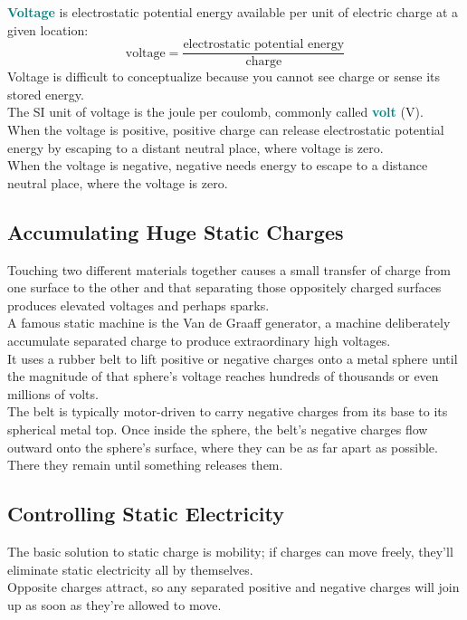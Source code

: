 \documentclass[12pt]{article}
\theoremstyle{definition}
\newcommand{\defnterm}[1]{\textbf{\textcolor{teal}{#1}}\index{#1}}
\begin{document}
\defnterm{Voltage} is electrostatic potential energy available per unit of electric charge at a given location:
$$\text{voltage} = \frac{\text{electrostatic potential energy}}{\text{charge}}$$
Voltage is difficult to conceptualize because you cannot see charge or sense its stored energy. \\
The SI unit of voltage is the joule per coulomb, commonly called \defnterm{volt} (V). \\
When the voltage is positive, positive charge can release electrostatic potential energy by escaping to a distant neutral place, where voltage is zero. \\
When the voltage is negative, negative needs energy to escape to a distance neutral place, where the voltage is zero.

\subsection{Accumulating Huge Static Charges}
Touching two different materials together causes a small transfer of charge from one surface to the other and that separating those oppositely charged surfaces produces elevated voltages and perhaps sparks. \\

A famous static machine is the Van de Graaff generator, a machine deliberately accumulate separated charge to produce extraordinary high voltages. \\
It uses a rubber belt to lift positive or negative charges onto a metal sphere until the magnitude of that sphere's voltage reaches hundreds of thousands or even millions of volts. \\
The belt is typically motor-driven to carry negative charges from its base to its spherical metal top.
Once inside the sphere, the belt's negative charges flow outward onto the sphere's surface, where they can be as far apart as possible.
There they remain until something releases them.

\subsection{Controlling Static Electricity}
The basic solution to static charge is mobility;
if charges can move freely, they'll eliminate static electricity all by themselves. \\
Opposite charges attract, so any separated positive and negative charges will join up as soon as they're allowed to move. \\
\end{document}
